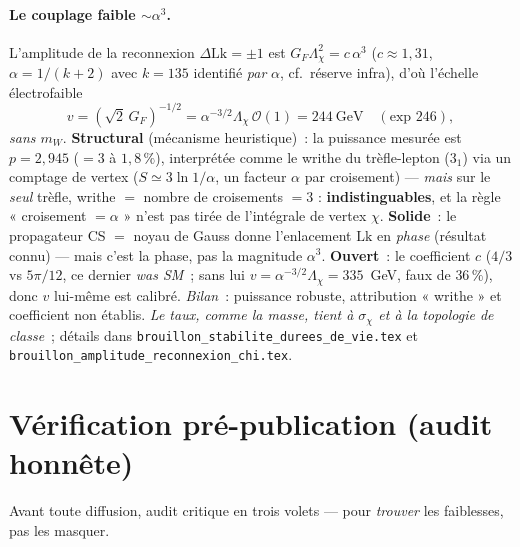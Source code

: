 \documentclass[11pt]{article}
\newcommand{\Lk}{\mathrm{Lk}}
\begin{document}
\paragraph{Le couplage faible $\sim\alpha^3$.} L'amplitude de la reconnexion $\Delta\Lk{=}\pm1$ est
$G_F\Lambda_\chi^2=c\,\alpha^3$ ($c\approx1{,}31$, $\alpha=1/(k{+}2)$ avec $k{=}135$ identifié \emph{par} $\alpha$, cf.\ réserve infra), d'où l'échelle électrofaible
\[
v=(\sqrt2\,G_F)^{-1/2}=\alpha^{-3/2}\Lambda_\chi\,\mathcal{O}(1)=244~\text{GeV}\quad(\text{exp }246),
\]
\emph{sans $m_W$}. \textbf{Structural} (mécanisme heuristique)~: la puissance mesurée est
$p=2{,}945$ ($=3$ à $1{,}8\,\%$), interprétée comme le writhe du trèfle-lepton ($3_1$) via un
comptage de vertex ($S\simeq3\ln1/\alpha$, un facteur $\alpha$ par croisement) --- \emph{mais}
sur le \emph{seul} trèfle, writhe $=$ nombre de croisements $=3$ : \textbf{indistinguables}, et la
règle « croisement $=\alpha$ » n'est pas tirée de l'intégrale de vertex $\chi$. \textbf{Solide}~:
le propagateur CS $=$ noyau de Gauss donne l'enlacement $\Lk$ en \emph{phase} (résultat connu) ---
mais c'est la phase, pas la magnitude $\alpha^3$. \textbf{Ouvert}~: le coefficient $c$ ($4/3$ vs
$5\pi/12$, ce dernier \emph{was SM}~; sans lui $v=\alpha^{-3/2}\Lambda_\chi=335$~GeV, faux de $36\,\%$),
donc $v$ lui-même est calibré. \emph{Bilan}~: puissance robuste, attribution « writhe » et
coefficient non établis.
\emph{Le taux, comme la masse, tient à $\sigma_\chi$ et à la topologie de classe}~; détails dans
\texttt{brouillon\_stabilite\_durees\_de\_vie.tex} et \texttt{brouillon\_amplitude\_reconnexion\_chi.tex}.

\section{Vérification pré-publication (audit honnête)}

Avant toute diffusion, audit critique en trois volets --- pour \emph{trouver} les faiblesses, pas les masquer.
\end{document}
